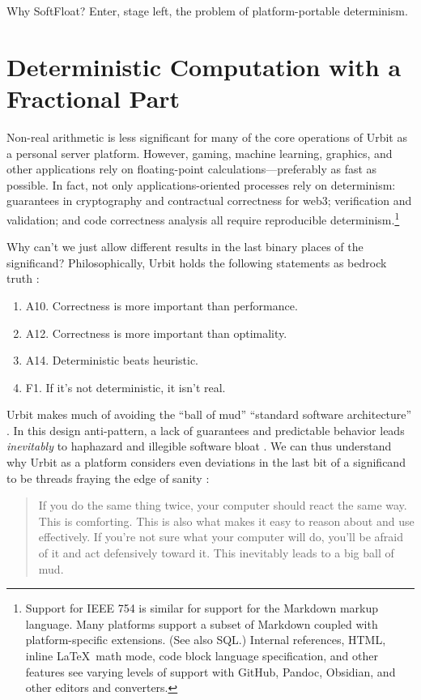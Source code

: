 \documentclass[twoside]{article}
\begin{document}
Why SoftFloat?  Enter, stage left, the problem of platform-portable determinism.


\section{Deterministic Computation with a Fractional Part}

Non-real arithmetic is less significant for many of the core operations of Urbit as a personal server platform.  However, gaming, machine learning, graphics, and other applications rely on floating-point calculations—preferably as fast as possible.  In fact, not only applications-oriented processes rely on determinism:  guarantees in cryptography and contractual correctness for web3; verification and validation; and code correctness analysis all require reproducible determinism.\footnote{Support for IEEE 754 is similar for support for the Markdown markup language.  Many platforms support a subset of Markdown coupled with platform-specific extensions.  (See also SQL.)  Internal references, HTML, inline \LaTeX~math mode, code block language specification, and other features see varying levels of support with GitHub, Pandoc, Obsidian, and other editors and converters.}

Why can't we just allow different results in the last binary places of the significand?  Philosophically, Urbit holds the following statements as bedrock truth \citep{Monk2020}:

\begin{enumerate}
  \item  A10.  Correctness is more important than performance.
  \item  A12.  Correctness is more important than optimality.
  \item  A14.  Deterministic beats heuristic.
  \item  F1.  If it's not deterministic, it isn't real.
\end{enumerate}

Urbit makes much of avoiding the “ball of mud” “standard software architecture” \citep{Foote1999}.  In this design anti-pattern, a lack of guarantees and predictable behavior leads \emph{inevitably} to haphazard and illegible software bloat \citep{Foote1999}.  We can thus understand why Urbit as a platform considers even deviations in the last bit of a significand to be threads fraying the edge of sanity \citet{Monk2020a}:

\begin{quote}
If you do the same thing twice, your computer should react the same way.  This is comforting.  This is also what makes it easy to reason about and use effectively.  If you're not sure what your computer will do, you'll be afraid of it and act defensively toward it.  This inevitably leads to a big ball of mud.
\end{quote}
\end{document}
